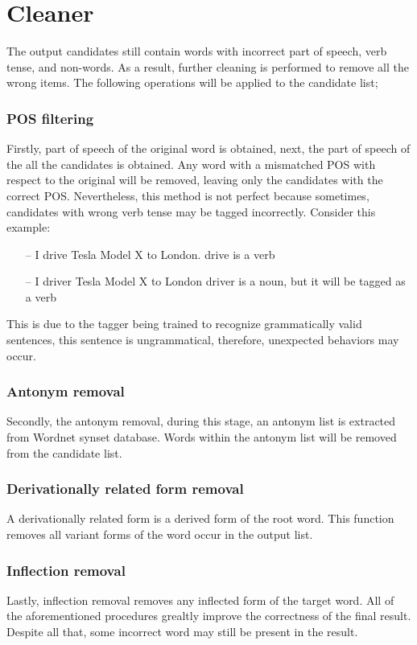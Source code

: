 \documentclass[12pt,oneside,openright,a4paper]{cpe-english-project}
\begin{document}
\section{Cleaner}
The output candidates still contain words with incorrect part of speech, verb tense, and non-words. As a result, further cleaning is performed to remove all the wrong items. The following operations will be applied to the candidate list; 
\subsubsection{POS filtering}
Firstly, part of speech of the original word is obtained, next, the part of speech of the all the candidates is obtained. Any word with a mismatched POS with respect to the original will be removed, leaving only the candidates with the correct POS. Nevertheless, this method is not perfect because sometimes, candidates with wrong verb tense may be tagged incorrectly. Consider this example:

\begin{itemize}
\item[--]I drive Tesla Model X to London. drive is a verb
\item[--]I driver Tesla Model X to London driver is a noun, but it will be tagged as a verb
\end{itemize}
This is due to the tagger being trained to recognize grammatically valid sentences, this sentence is ungrammatical, therefore, unexpected behaviors may occur. 

\subsubsection{Antonym removal}
Secondly, the antonym removal, during this stage, an antonym list is extracted from Wordnet synset database. Words within the antonym list will be removed from the candidate list. 
\subsubsection{Derivationally related form removal}
A derivationally related form is a derived form of the root word. This function removes all variant forms of the word occur in the output list. 

\subsubsection{Inflection removal}
Lastly, inflection removal removes any inflected form of the target word. All of the aforementioned procedures grealtly improve the correctness of the final result. Despite all that, some incorrect word may still be present in the result. 
\end{document}
